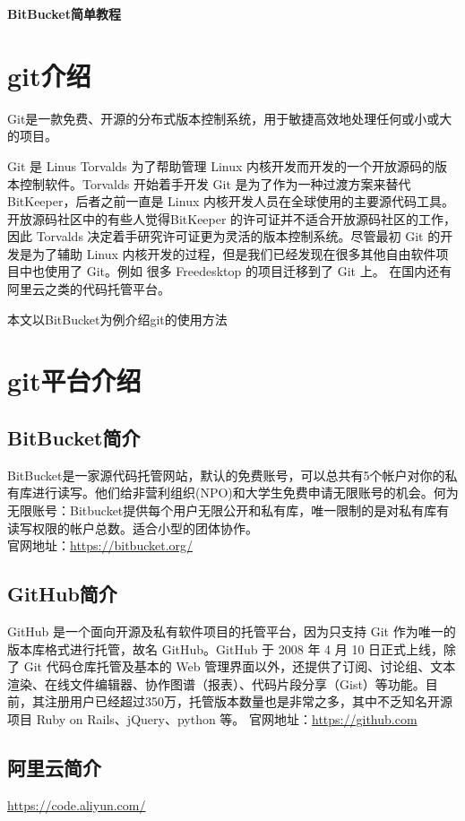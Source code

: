 \documentclass[a4paper,12pt]{ctexart}
\begin{document}
\begin{center}
\huge \textbf{BitBucket简单教程}
\end{center}

\tableofcontents

\newpage

\chapter{git介绍}
Git是一款免费、开源的分布式版本控制系统，用于敏捷高效地处理任何或小或大的项目。

Git 是 Linus Torvalds 为了帮助管理 Linux 内核开发而开发的一个开放源码的版本控制软件。Torvalds 开始着手开发 Git 是为了作为一种过渡方案来替代 BitKeeper，后者之前一直是 Linux 内核开发人员在全球使用的主要源代码工具。开放源码社区中的有些人觉得BitKeeper 的许可证并不适合开放源码社区的工作，因此 Torvalds 决定着手研究许可证更为灵活的版本控制系统。尽管最初 Git 的开发是为了辅助 Linux 内核开发的过程，但是我们已经发现在很多其他自由软件项目中也使用了 Git。例如 很多 Freedesktop 的项目迁移到了 Git 上。
在国内还有阿里云之类的代码托管平台。

\textcolor[rgb]{0.00,1.00,0.25}{本文以BitBucket为例介绍git的使用方法}
\chapter{git平台介绍}
\section{BitBucket简介}
BitBucket是一家源代码托管网站，默认的免费账号，可以总共有5个帐户对你的私有库进行读写。他们给非营利组织(NPO)和大学生免费申请无限账号的机会。何为无限账号：Bitbucket提供每个用户无限公开和私有库，唯一限制的是对私有库有读写权限的帐户总数。适合小型的团体协作。\\
官网地址：\url{https://bitbucket.org/}
\section{GitHub简介}
GitHub 是一个面向开源及私有软件项目的托管平台，因为只支持 Git 作为唯一的版本库格式进行托管，故名 GitHub。GitHub 于 2008 年 4 月 10 日正式上线，除了 Git 代码仓库托管及基本的 Web 管理界面以外，还提供了订阅、讨论组、文本渲染、在线文件编辑器、协作图谱（报表）、代码片段分享（Gist）等功能。目前，其注册用户已经超过350万，托管版本数量也是非常之多，其中不乏知名开源项目 Ruby on Rails、jQuery、python 等。
官网地址：\url{https://github.com}
\section{阿里云简介}
\url{https://code.aliyun.com/}
\end{document}
